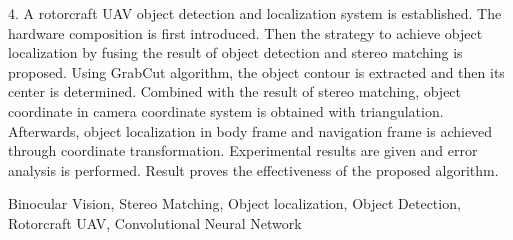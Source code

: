 \begin{Abstract}
4. A rotorcraft UAV object detection and localization system is established. The hardware composition is first introduced. Then the strategy to achieve object localization by fusing the result of object detection and stereo matching is proposed. Using GrabCut algorithm, the object contour is extracted and then its center is determined. Combined with the result of stereo matching, object coordinate in camera coordinate system is obtained with triangulation. Afterwards, object localization in body frame and navigation frame is achieved through coordinate transformation. Experimental results are given and error analysis is performed. Result proves the effectiveness of the proposed algorithm.


    \begin{Keywords}
        Binocular Vision, Stereo Matching, Object localization, Object Detection, Rotorcraft UAV, Convolutional Neural Network
    \end{Keywords}
\end{Abstract}






